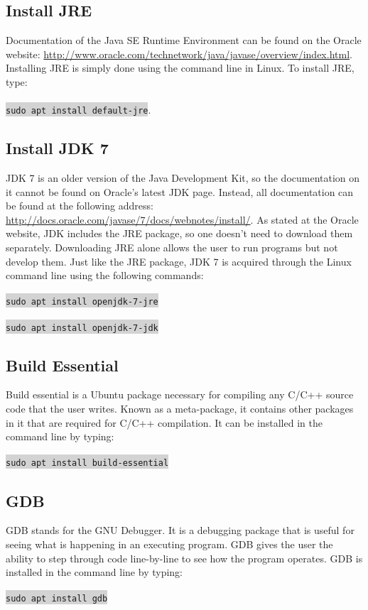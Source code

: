 \documentclass[11pt,a4paper,titlepage]{article}
\begin{document}
	\subsection{Install JRE}
	 Documentation of the Java SE Runtime Environment can be found on the Oracle website: \url{http://www.oracle.com/technetwork/java/javase/overview/index.html}.\\
	  Installing JRE is simply done using the command line in Linux. To install JRE, type: \\
	  \\
	 \colorbox{lightgray}{\texttt{sudo apt install default-jre}}.
	 
	 \subsection{Install JDK 7}
	 JDK 7 is an older version of the Java Development Kit, so the documentation on it cannot be found on Oracle's latest JDK page. Instead, all documentation can be found at the following address: \url{http://docs.oracle.com/javase/7/docs/webnotes/install/}. As stated at the Oracle website, JDK includes the JRE package, so one doesn't need to download them separately. Downloading JRE alone allows the user to run programs but not develop them. Just like the JRE package, JDK 7 is acquired through the Linux command line using the following commands: \\
	 \\
	 \colorbox{lightgray}{\texttt{sudo apt install openjdk-7-jre}} \\
	 \\
	 \colorbox{lightgray}{\texttt{sudo apt install openjdk-7-jdk}}
	 
	 \subsection{Build Essential}
	 Build essential is a Ubuntu package necessary for compiling any C/C++ source code that the user writes. Known as a meta-package, it contains other packages in it that are required for C/C++ compilation. It can be installed in the command line by typing: \\
	 \\
	 \colorbox{lightgray}{\texttt{sudo apt install build-essential}}
	 
	 \subsection{GDB}
	 GDB stands for the GNU Debugger. It is a debugging package that is useful for seeing what is happening in an executing program. GDB gives the user the ability to step through code line-by-line to see how the program operates. GDB is installed in the command line by typing: \\
	 \\
	 \colorbox{lightgray}{\texttt{sudo apt install gdb}}
	 
\end{document}
